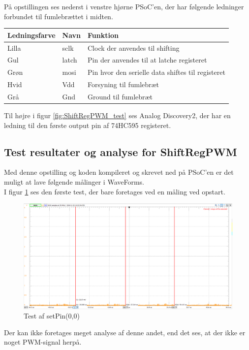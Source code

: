 \documentclass[Modultest/Modultest_main.tex]{subfiles}
\begin{document}
På opstillingen ses nederst i venstre hjørne PSoC'en, der har følgende ledninger forbundet til fumlebrættet i midten.

\begin{table}[H]
\centering
\begin{tabular}{|L{0.25\textwidth}|L{0.1\textwidth}|L{0.55\textwidth}|}
\hline
\textbf{Ledningsfarve} & \textbf{Navn} & \textbf{Funktion}                         \\ \hline
Lilla                  & sclk          & Clock der anvendes til shifting           \\ \hline
Gul                    & latch         & Pin der anvendes til at latche registeret \\ \hline
Grøn                   & mosi          & Pin hvor den serielle data shiftes til registeret \\ \hline
Hvid                   & Vdd           & Forsyning til fumlebræt                   \\ \hline
Grå                    & Gnd           & Ground til fumlebræt                      \\ \hline
\end{tabular}%

\end{table}

Til højre i figur \ref{fig:ShiftRegPWM_test} ses Analog Discovery2, der har en ledning til den første output pin af 74HC595 registeret.

\subsection{Test resultater og analyse for ShiftRegPWM}

Med denne opstilling og koden kompileret og skrevet ned på PSoC'en er det muligt at lave følgende målinger i WaveForms.
\\I figur \ref{fig:test_0_pin_0} ses den første test, der bare foretages ved en måling ved opstart.

\begin{figure}[H]
    \centering
    \includegraphics[width=\textwidth]{Modultest/CupLight/graphics/pwm_0.png}
    \caption{Test af setPin(0,0)}
    \label{fig:test_0_pin_0}
\end{figure}
Der kan ikke foretages meget analyse af denne andet, end det ses, at der ikke er noget PWM-signal herpå.
\end{document}
